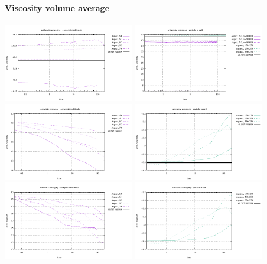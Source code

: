 \paragraph{Viscosity volume average}
\begin{center}
\includegraphics[width=5.7cm]{images/stokes_sphere_fs2D/avrg_viscosity_arithm_comp}
\includegraphics[width=5.7cm]{images/stokes_sphere_fs2D/avrg_viscosity_arithm_pic}\\
\includegraphics[width=5.7cm]{images/stokes_sphere_fs2D/avrg_viscosity_geom_comp}
\includegraphics[width=5.7cm]{images/stokes_sphere_fs2D/avrg_viscosity_geom_pic}\\
\includegraphics[width=5.7cm]{images/stokes_sphere_fs2D/avrg_viscosity_harm_comp}
\includegraphics[width=5.7cm]{images/stokes_sphere_fs2D/avrg_viscosity_harm_pic}
\end{center}


